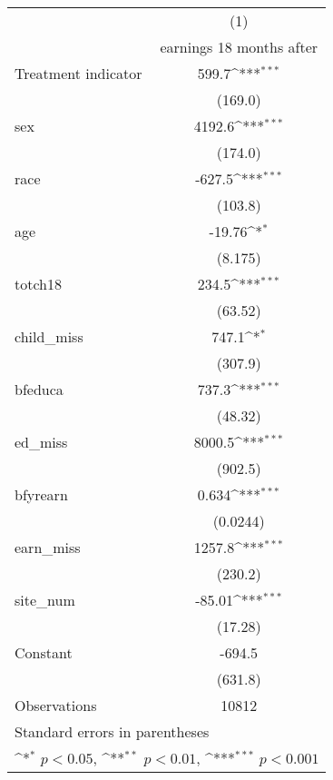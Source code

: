 {
\def\sym#1{\ifmmode^{#1}\else\(^{#1}\)\fi}
\begin{tabular}{l*{1}{c}}
\hline\hline
                    &\multicolumn{1}{c}{(1)}\\
                    &\multicolumn{1}{c}{earnings 18 months after}\\
\hline
Treatment indicator &       599.7\sym{***}\\
                    &     (169.0)         \\
[1em]
sex                 &      4192.6\sym{***}\\
                    &     (174.0)         \\
[1em]
race                &      -627.5\sym{***}\\
                    &     (103.8)         \\
[1em]
age                 &      -19.76\sym{*}  \\
                    &     (8.175)         \\
[1em]
totch18             &       234.5\sym{***}\\
                    &     (63.52)         \\
[1em]
child\_miss          &       747.1\sym{*}  \\
                    &     (307.9)         \\
[1em]
bfeduca             &       737.3\sym{***}\\
                    &     (48.32)         \\
[1em]
ed\_miss             &      8000.5\sym{***}\\
                    &     (902.5)         \\
[1em]
bfyrearn            &       0.634\sym{***}\\
                    &    (0.0244)         \\
[1em]
earn\_miss           &      1257.8\sym{***}\\
                    &     (230.2)         \\
[1em]
site\_num            &      -85.01\sym{***}\\
                    &     (17.28)         \\
[1em]
Constant            &      -694.5         \\
                    &     (631.8)         \\
\hline
Observations        &       10812         \\
\hline\hline
\multicolumn{2}{l}{\footnotesize Standard errors in parentheses}\\
\multicolumn{2}{l}{\footnotesize \sym{*} \(p<0.05\), \sym{**} \(p<0.01\), \sym{***} \(p<0.001\)}\\
\end{tabular}
}
